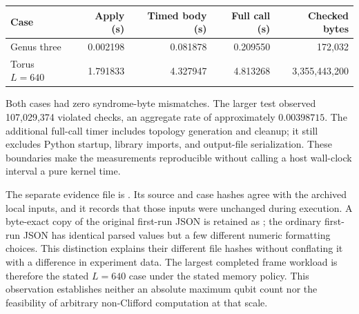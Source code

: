 \begin{center}
\begin{tabular}{lrrrr}
\hline
Case & Apply (s) & Timed body (s) & Full call (s) & Checked bytes\\
\hline
Genus three & 0.002198 & 0.081878 & 0.209550 & 172,032\\
Torus $L=640$ & 1.791833 & 4.327947 & 4.813268 & 3,355,443,200\\
\hline
\end{tabular}
\end{center}

Both cases had zero syndrome-byte mismatches.  The larger test observed
107,029,374 violated checks, an aggregate rate of approximately
$0.00398715$.  The additional full-call timer includes topology
generation and cleanup; it still excludes Python startup, library
imports, and output-file serialization.  These boundaries make the
measurements reproducible without calling a host wall-clock interval
a pure kernel time.

The separate evidence file is
.  Its source and
case hashes agree with the archived local inputs, and it records that
those inputs were unchanged during execution.  A byte-exact copy of the
original first-run JSON is retained as
; the
ordinary first-run JSON has identical parsed values but a few different
numeric formatting choices.  This distinction explains their different
file hashes without conflating it with a difference in experiment data.
The largest completed frame workload is therefore the stated $L=640$
case under the stated memory policy.  This observation establishes
neither an absolute maximum qubit count nor the feasibility of arbitrary
non-Clifford computation at that scale.
